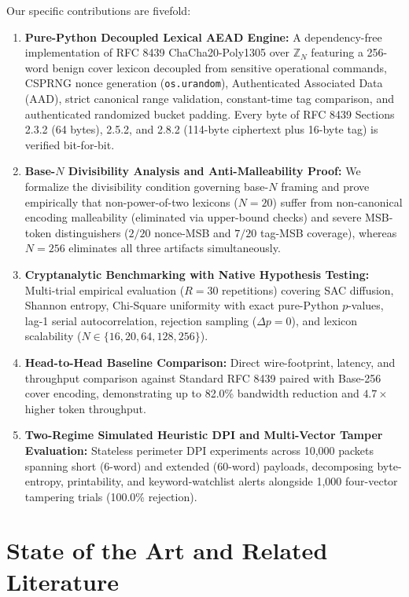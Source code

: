 \documentclass[conference]{IEEEtran}
\begin{document}
Our specific contributions are fivefold:
\begin{enumerate}
    \item \textbf{Pure-Python Decoupled Lexical AEAD Engine:} A dependency-free implementation of RFC 8439 ChaCha20-Poly1305 over $\mathbb{Z}_N$ featuring a 256-word benign cover lexicon decoupled from sensitive operational commands, CSPRNG nonce generation (\texttt{os.urandom}), Authenticated Associated Data (AAD), strict canonical range validation, constant-time tag comparison, and authenticated randomized bucket padding. Every byte of RFC 8439 Sections 2.3.2 (64 bytes), 2.5.2, and 2.8.2 (114-byte ciphertext plus 16-byte tag) is verified bit-for-bit.
    \item \textbf{Base-$N$ Divisibility Analysis and Anti-Malleability Proof:} We formalize the divisibility condition governing base-$N$ framing and prove empirically that non-power-of-two lexicons ($N=20$) suffer from non-canonical encoding malleability (eliminated via upper-bound checks) and severe MSB-token distinguishers ($2/20$ nonce-MSB and $7/20$ tag-MSB coverage), whereas $N=256$ eliminates all three artifacts simultaneously.
    \item \textbf{Cryptanalytic Benchmarking with Native Hypothesis Testing:} Multi-trial empirical evaluation ($R=30$ repetitions) covering SAC diffusion, Shannon entropy, Chi-Square uniformity with exact pure-Python $p$-values, lag-1 serial autocorrelation, rejection sampling ($\Delta p = 0$), and lexicon scalability ($N \in \{16, 20, 64, 128, 256\}$).
    \item \textbf{Head-to-Head Baseline Comparison:} Direct wire-footprint, latency, and throughput comparison against Standard RFC 8439 paired with Base-256 cover encoding, demonstrating up to 82.0\% bandwidth reduction and $4.7\times$ higher token throughput.
    \item \textbf{Two-Regime Simulated Heuristic DPI and Multi-Vector Tamper Evaluation:} Stateless perimeter DPI experiments across 10,000 packets spanning short (6-word) and extended (60-word) payloads, decomposing byte-entropy, printability, and keyword-watchlist alerts alongside 1,000 four-vector tampering trials (100.0\% rejection).
\end{enumerate}

\section{State of the Art and Related Literature}
\label{sec:state_of_art}
\end{document}
